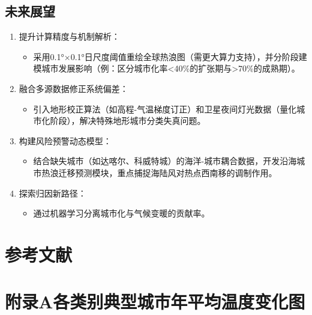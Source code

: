 \documentclass[a4paper,UTF8,scheme=chinese,zihao=-4,twoside]{ctexart}
\makeatletter
\newcommand{\初号}{\zihao{0}}
\newcommand{\小初}{\zihao{-0}}
\newcommand{\一号}{\zihao{1}}
\newcommand{\小一}{\zihao{-1}}
\newcommand{\二号}{\zihao{2}}
\newcommand{\小二}{\zihao{-2}}
\newcommand{\三号}{\zihao{3}}
\newcommand{\小三}{\zihao{-3}}
\newcommand{\四号}{\zihao{4}}
\newcommand{\小四}{\zihao{-4}}
\newcommand{\五号}{\zihao{5}}
\newcommand{\小五}{\zihao{-5}}
\newcommand{\六号}{\zihao{6}}
\newcommand{\小六}{\zihao{-6}}
\newcommand{\七号}{\zihao{7}}
\newcommand{\八号}{\zihao{8}}
\newcommand{\宋体}{\songti}
\newcommand{\黑体}{\heiti}
\newcommand{\仿宋}{\fangsong}
\newcommand{\楷书}{\kaishu}
\newcommand{\粗体}{\bfseries}
\newcommand{\斜体}{\itshape}
\newcommand\下划线[2][6em]{\hskip1pt\underline{\hb@xt@ #1{\hss#2\hss}}\hskip3pt}
\makeatother
\begin{document}
\subsection{未来展望}

\begin{enumerate}
    \item 提升计算精度与机制解析：
        \begin{itemize}
            \item 采用0.1°×0.1°日尺度阈值重绘全球热浪图（需更大算力支持），并分阶段建模城市发展影响（例：区分城市化率<40\%的扩张期与>70\%的成熟期）。
        \end{itemize}
    \item 融合多源数据修正系统偏差：
        \begin{itemize}
            \item 引入地形校正算法（如高程-气温梯度订正）和卫星夜间灯光数据（量化城市化阶段），解决特殊地形城市分类失真问题。
        \end{itemize}
    \item 构建风险预警动态模型：
        \begin{itemize}
            \item 结合缺失城市（如达喀尔、科威特城）的海洋-城市耦合数据，开发沿海城市热浪迁移预测模块，重点捕捉海陆风对热点西南移的调制作用。
        \end{itemize}
    \item 探索归因新路径：
        \begin{itemize}
            \item 通过机器学习分离城市化与气候变暖的贡献率。
        \end{itemize}
\end{enumerate}

\clearpage
{}
{}
\section{参考文献}
\rmfamily\五号
\printbibliography[heading=none]

\clearpage
{}
\appendix
\renewcommand\thesection{}
\renewcommand\thesubsection{}
\renewcommand{\thefigure}{A\arabic{figure}}
\setcounter{figure}{0}
\section*{附录A\quad 各类别典型城市年平均温度变化图}
\end{document}
